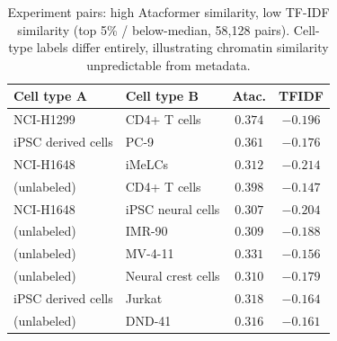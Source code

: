 \documentclass[conference]{IEEEtran}
\begin{document}
\begin{table}[!t]
  \centering
  \footnotesize
  \caption{Experiment pairs: high Atacformer similarity, low TF-IDF
  similarity (top 5\% / below-median, 58,128 pairs). Cell-type labels
  differ entirely, illustrating chromatin similarity unpredictable from
  metadata.}
  \label{tab:qual_atac}
  \setlength{\tabcolsep}{4pt}
  \begin{tabular}{llcc}
    \toprule
    Cell type A & Cell type B & Atac. & TFIDF \\
    \midrule
    NCI-H1299            & CD4+ T cells              & $0.374$ & $-0.196$ \\
    iPSC derived cells   & PC-9                      & $0.361$ & $-0.176$ \\
    NCI-H1648            & iMeLCs                    & $0.312$ & $-0.214$ \\
    (unlabeled)          & CD4+ T cells              & $0.398$ & $-0.147$ \\
    NCI-H1648            & iPSC neural cells         & $0.307$ & $-0.204$ \\
    (unlabeled)          & IMR-90                    & $0.309$ & $-0.188$ \\
    (unlabeled)          & MV-4-11                   & $0.331$ & $-0.156$ \\
    (unlabeled)          & Neural crest cells        & $0.310$ & $-0.179$ \\
    iPSC derived cells   & Jurkat                    & $0.318$ & $-0.164$ \\
    (unlabeled)          & DND-41                    & $0.316$ & $-0.161$ \\
    \bottomrule
  \end{tabular}
\end{table}
\end{document}
